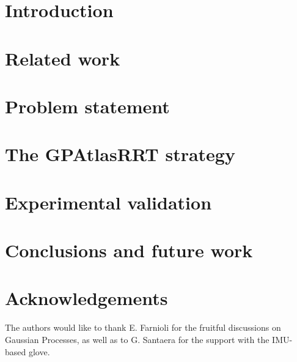 \documentclass{ws-ijhr}
\begin{document}
\section{Introduction}
\label{sec:intro}



\section{Related work}
\label{sec:related}



\section{Problem statement}
\label{sec:scope}



\section{The GPAtlasRRT strategy}
\label{sec:solution}



\section{Experimental validation}
\label{sec:experiments}



\section{Conclusions and future work}
\label{sec:conclusions}



\section*{Acknowledgements}
The authors would like to thank E. Farnioli for the fruitful discussions on Gaussian Processes, as well as to G. Santaera for the support with the IMU-based glove.
\end{document}
